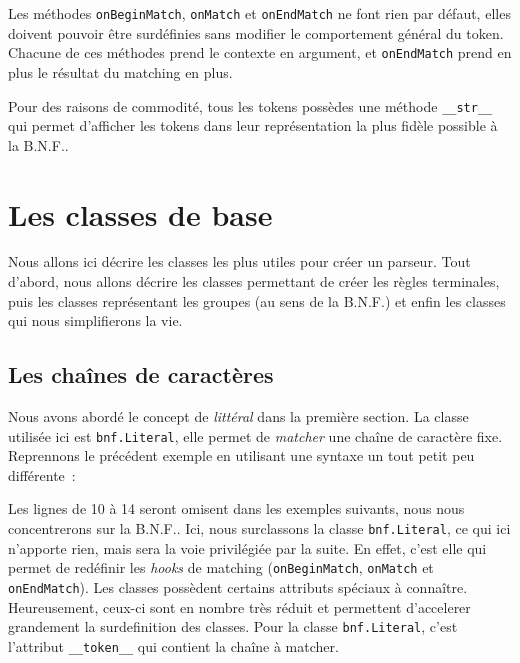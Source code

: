 \documentclass[a4paper]{article}
\newcommand{\insertpython}[1]{%
{\ttfamily}%
}
\newcommand{\fixed}[1]{\texttt{#1}}
\newcommand{\bnf}{B.N.F.}
\begin{document}
            \noindent
            Les méthodes \fixed{onBeginMatch}, \fixed{onMatch} et
            \fixed{onEndMatch} ne font rien par défaut, elles doivent pouvoir être
            surdéfinies sans modifier le comportement général du token. Chacune
            de ces méthodes prend le contexte en argument, et \fixed{onEndMatch}
            prend en plus le résultat du matching en plus.

            Pour des raisons de commodité, tous les tokens possèdes une méthode
            \fixed{\_\_str\_\_} qui permet d'afficher les tokens dans leur
            représentation la plus fidèle possible à la \bnf.

    \newpage
    \section{Les classes de base}
        Nous allons ici décrire les classes les plus utiles pour créer un parseur.
        Tout d'abord, nous allons décrire les classes permettant de créer les
        règles terminales, puis les classes représentant les groupes (au sens de
        la \bnf) et enfin les classes qui nous simplifierons la vie.

        \subsection{Les chaînes de caractères}
            Nous avons abordé le concept de \emph{littéral} dans la première
            section. La classe utilisée ici est \fixed{bnf.Literal}, elle permet
            de \emph{matcher} une chaîne de caractère fixe. Reprennons le précédent
            exemple en utilisant une syntaxe un tout petit peu différente~:
            \insertpython{listings/bnf/ex02.py}
            Les lignes de 10 à 14 seront omisent dans les exemples suivants,
            nous nous concentrerons sur la \bnf. Ici, nous surclassons la
            classe \fixed{bnf.Literal}, ce qui ici n'apporte rien, mais sera
            la voie privilégiée par la suite. En effet, c'est elle
            qui permet de redéfinir les \emph{hooks} de matching
            (\fixed{onBeginMatch}, \fixed{onMatch} et \fixed{onEndMatch}).
            Les classes possèdent certains attributs spéciaux à connaître.
            Heureusement, ceux-ci sont en nombre très réduit et permettent
            d'accelerer grandement la surdefinition des classes. Pour la classe
            \fixed{bnf.Literal}, c'est l'attribut \fixed{\_\_token\_\_} qui
            contient la chaîne à matcher.
\end{document}
